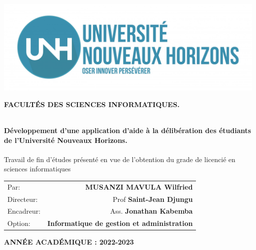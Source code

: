 

\thispagestyle{empty}


\begin{center}
	\includegraphics[scale=0.20]{gfx/logo-white}
\end{center}

\begin{center}
	\large{
		\textbf{
			FACULTÉS DES SCIENCES INFORMATIQUES. \\
		}
	}
\end{center}

\vspace{2cm}
\begin{center}
	\hrulefill \\
	\large{
		\textbf{
			Développement d’une application d’aide à la délibération des étudiants de
            l’Université Nouveaux Horizons. \\
		}
	}
	\hrulefill \\
	Travail de fin d’études présenté en vue de l’obtention du grade de licencié en sciences informatiques
\end{center}

\hfill
\begin{tabular}{lr}
	Par: & \textbf{MUSANZI MAVULA Wilfried} \\
	Directeur: & Prof \textbf{Saint-Jean Djungu}\\
	Encadreur: & Ass. \textbf{Jonathan Kabemba} \\
	Option: & \textbf{Informatique de gestion et administration}
\end{tabular}


\vfill
\begin{center}
	\large{
		\textbf{
			ANNÉE ACADÉMIQUE : 2022-2023
		}
	}
\end{center}